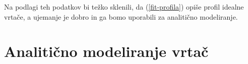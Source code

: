 \documentclass[a4paper, oneside, 12pt]{book}
\begin{document}
        Na podlagi teh podatkov bi težko sklenili, da (\ref{fit-profila}) opiše profil idealne vrtače, a ujemanje je dobro in ga bomo uporabili za analitično modeliranje. 


        \chapter{Analitično modeliranje vrtač}
        \label{analiticno-modeliranje}

\end{document}
